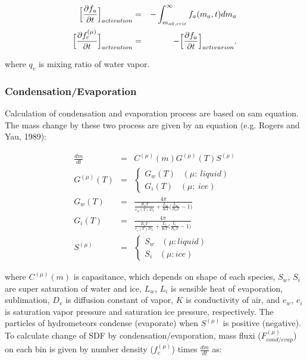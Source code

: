 \begin{eqnarray}
\Bigl[\frac{\partial f_{a}}{\partial t}\Bigr]_{activation}&=&-\int_{m_{a0,crit}}^{\infty}f_{a}(m_{a},t)dm_{a}\\
\Bigl[\frac{\partial f_{c}^{(\mu)}}{\partial t}\Bigr]_{activation}&=&-\Bigl[\frac{\partial f_{a}}{\partial t}\Bigr]_{activarion}.
\end{eqnarray}

where $q_{v}$ is mixing ratio of water vapor.

\subsubsection{Condensation/Evaporation}
Calculation of condensation and evaporation process are based on sam equation. The mass change by these two process are given by an equation (e.g. Rogers and Yau, 1989):

\begin{eqnarray}
\frac{dm}{dt}&=&C^{(\mu)}(m)G^{(\mu)}(T)S^{(\mu)}\\
G^{(\mu)}(T)&=&
\left\{
\begin{array}{l}
G_{w}(T)\;\;\;(\mu : \:liquid)\\
G_{i}(T)\;\;\;(\mu : \:ice)
\end{array}\right. \nonumber\\
G_{w}(T)&=&\frac{4\pi}{\frac{R_{v}T}{e_{w}(T)D_{v}}+\frac{L_{w}}{KT}\bigl( \frac{L_{w}}{R_{v}T}-1\Bigr )}\nonumber\\
G_{i}(T)&=&\frac{4\pi}{\frac{R_{v}T}{e_{i}(T)D_{v}}+\frac{L_{i}}{KT}\bigl( \frac{L_{i}}{R_{v}T}-1\Bigr )}\nonumber\\
S^{(\mu)}&=&
\left\{
\begin{array}{l}
S_{w}\;\;\;(\mu : liquid)\\
S_{i}\;\;\;(\mu : ice)
\end{array}\right.\nonumber
\end{eqnarray}

where $C^{(\mu)}(m)$ is capasitance, which depends on shape of each species, $S_{w}$, $S_{i}$ are super saturation of water and ice, $L_{w}$, $L_{i}$ is sensible heat of evaporation, sublimation, $D_{v}$ is diffusion constant of vapor, $K$ is conductivity of air, and $e_{w}$, $e_{i}$ is saturation vapor pressure and saturation ice pressure, respectively. The particles of hydrometeors condense (evaporate) when $S^{(\mu)}$ is positive (negative).\\
To calculate change of SDF by condensation/evaporation, mass fluxi ($F^{(\mu)}_{cond/evap}$) on each bin is given by number density ($f_{c}^{(\mu)}$) times $\frac{dm}{dt}$ as:

